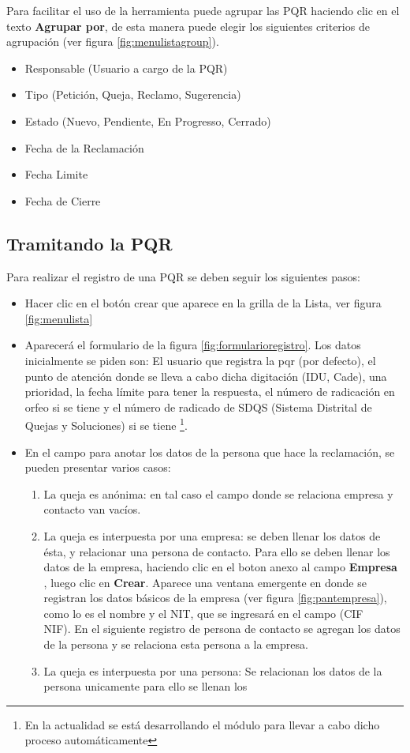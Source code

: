 Para facilitar el uso de la herramienta puede agrupar las PQR haciendo clic en el texto \textbf{Agrupar por}, de esta manera puede elegir los siguientes
criterios de agrupación (ver figura \ref{fig:menulistagroup}).
\begin{itemize}
 \item Responsable (Usuario a cargo de la PQR)
 \item Tipo (Petición, Queja, Reclamo, Sugerencia)
 \item Estado (Nuevo, Pendiente, En Progresso, Cerrado)
 \item Fecha de la Reclamación
 \item Fecha Limite
 \item Fecha de Cierre
\end{itemize}


\subsection{Tramitando la PQR}

Para realizar el registro de una PQR se deben seguir los siguientes pasos:

\begin{itemize}
 \item Hacer clic en el botón crear que aparece en la grilla de la Lista, ver figura \ref{fig:menulista} 
 \item Aparecerá el formulario de la figura \ref{fig:formularioregistro}. Los datos inicialmente se  piden son: El usuario que registra 
 la pqr (por defecto), el punto de atención donde se lleva a cabo dicha digitación (IDU, Cade), una prioridad, la fecha límite para tener la respuesta, el número
 de radicación en orfeo si se tiene y el número de radicado de SDQS (Sistema Distrital de Quejas y Soluciones) si se tiene \footnote{En la actualidad 
 se está desarrollando el módulo para llevar a cabo dicho proceso automáticamente}. 
 \item En el campo para anotar los datos de la persona que hace la reclamación, se pueden presentar varios casos: 
 \begin{enumerate}
  \item La queja es anónima: en tal caso el campo donde se relaciona empresa y contacto van vacíos. 
  \item La queja es interpuesta por una empresa: se deben llenar los datos de ésta, y relacionar una persona de contacto. Para ello se deben llenar 
  los datos de la empresa, haciendo clic en el boton anexo al campo 
  \textbf{Empresa} , luego clic en \textbf{Crear}. Aparece una ventana emergente en donde se registran los
  datos básicos de la empresa (ver figura \ref{fig:pantempresa}), como lo es el nombre y el NIT, que se ingresará en el campo (CIF\\NIF). En el siguiente registro
  de persona de contacto se agregan los datos de la persona y se relaciona esta persona a la empresa.
  \item La queja es interpuesta por una persona: Se relacionan los datos de la persona unicamente para ello se llenan los  
  
 \end{enumerate}

\end{itemize}


